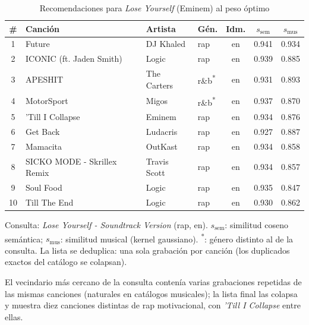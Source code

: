 \begin{table}[htbp]
  \centering
  \begin{threeparttable}
  \caption{Recomendaciones para \emph{Lose Yourself} (Eminem) al peso óptimo}
  \label{tab:qual_case_lose_yourself}
  \small
  \begin{tabular}{clllccc}
    \toprule
    \# & Canción & Artista & Gén. & Idm. & $s_{\text{sem}}$ & $s_{\text{mus}}$ \\
    \midrule
    1 & Future & DJ Khaled & rap & en & 0.941 & 0.934 \\
    2 & ICONIC (ft. Jaden Smith) & Logic & rap & en & 0.939 & 0.885 \\
    3 & APESHIT & The Carters & r\&b\textsuperscript{*} & en & 0.931 & 0.893 \\
    4 & MotorSport & Migos & r\&b\textsuperscript{*} & en & 0.937 & 0.870 \\
    5 & 'Till I Collapse & Eminem & rap & en & 0.934 & 0.876 \\
    6 & Get Back & Ludacris & rap & en & 0.927 & 0.887 \\
    7 & Mamacita & OutKast & rap & en & 0.934 & 0.858 \\
    8 & SICKO MODE - Skrillex Remix & Travis Scott & rap & en & 0.934 & 0.857 \\
    9 & Soul Food & Logic & rap & en & 0.935 & 0.847 \\
    10 & Till The End & Logic & rap & en & 0.930 & 0.862 \\
    \bottomrule
  \end{tabular}
  \begin{tablenotes}[flushleft]
    \small
    \item Consulta: \emph{Lose Yourself - Soundtrack Version} (rap, en). $s_{\text{sem}}$: similitud coseno semántica; $s_{\text{mus}}$: similitud musical (kernel gaussiano). \textsuperscript{*}: género distinto al de la consulta. La lista se deduplica: una sola grabación por canción (los duplicados exactos del catálogo se colapsan).
    \item El vecindario más cercano de la consulta contenía varias grabaciones repetidas de las mismas canciones (naturales en catálogos musicales); la lista final las colapsa y muestra diez canciones distintas de rap motivacional, con \emph{'Till I Collapse} entre ellas.
  \end{tablenotes}
  \end{threeparttable}
\end{table}